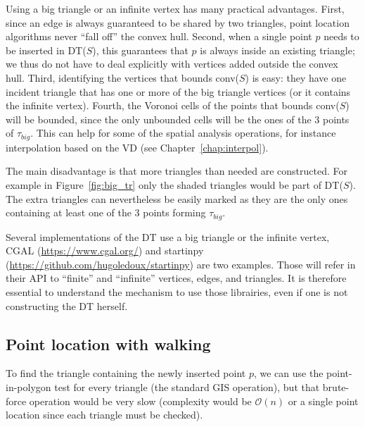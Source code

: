 Using a big triangle or an infinite vertex has many practical advantages. 
First, since an edge is always guaranteed to be shared by two triangles, point location algorithms never ``fall off'' the convex hull. 
Second, when a single point $p$ needs to be inserted in DT($S$), this guarantees that $p$ is always inside an existing triangle; we thus do not have to deal explicitly with vertices added outside the convex hull. 
Third, identifying the vertices that bounds conv($S$) is easy: they have one incident triangle that has one or more of the big triangle vertices (or it contains the infinite vertex).
Fourth, the Voronoi cells of the points that bounds conv($S$) will be bounded, since the only unbounded cells will be the ones of the 3 points of $\tau_{big}$. 
This can help for some of the spatial analysis operations, for instance interpolation based on the VD (see Chapter~\ref{chap:interpol}).

%

The main disadvantage is that more triangles than needed are constructed. 
For example in Figure~\ref{fig:big_tr} only the shaded triangles would be part of DT($S$). 
The extra triangles can nevertheless be easily marked as they are the only ones containing at least one of the 3 points forming $\tau_{big}$. 

%

\begin{floatbox}
  \begin{kaobox-practice}[frametitle=\faCog\ How are DT created in practice?]
  Several implementations of the DT use a big triangle or the infinite vertex,  CGAL (\url{https://www.cgal.org/}) and startinpy (\url{https://github.com/hugoledoux/startinpy}) are two examples.
  Those will refer in their API to ``finite'' and ``infinite'' vertices, edges, and triangles.
  It is therefore essential to understand the mechanism to use those librairies, even if one is not constructing the DT herself.
  \end{kaobox-practice}
\end{floatbox}


\subsection{Point location with walking}%
\label{sec:dtwalk}

To find the triangle containing the newly inserted point $p$, we can use the point-in-polygon test for every triangle (the standard GIS operation), but that brute-force operation would be very slow (complexity would be $\mathcal{O}(n)$ or a single point location since each triangle must be checked).

